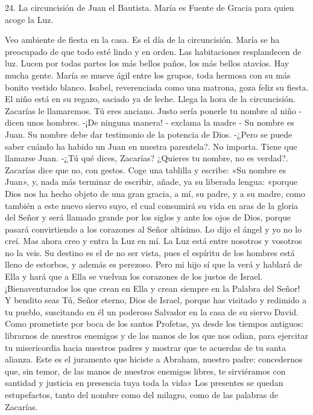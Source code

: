 \documentclass[12pt]{book} %
\begin{document}
 
 
24. 
La circuncisión de Juan el Bautista. 
María es Fuente de Gracia para quien acoge la Luz. 
 
Veo ambiente de fiesta en la casa. Es el día de la circuncisión. 
María se ha preocupado de que todo esté lindo y en orden. Las habitaciones resplandecen de luz. Lucen por todas partes los más bellos paños, los más bellos atavíos. Hay mucha gente. María se mueve ágil entre los grupos, toda hermosa con su más bonito vestido blanco. 
Isabel, reverenciada como una matrona, goza feliz su fiesta. El niño está en su regazo, saciado ya de leche. 
Llega la hora de la circuncisión. 
Zacarías le llamaremos. Tú eres anciano. Justo sería ponerle tu nombre al niño - dicen unos hombres. 
-¡De ninguna manera! - exclama la madre - Su nombre es Juan. Su nombre debe dar testimonio de la potencia de Dios. 
-¿Pero se puede saber cuándo ha habido un Juan en nuestra parentela?. 
No importa. Tiene que llamarse Juan. 
-¿Tú qué dices, Zacarías? ¿Quieres tu nombre, no es verdad?. 
Zacarías dice que no, con gestos. Coge una tablilla y escribe: «Su nombre es Juan», y, nada más terminar de escribir, 
añade, ya su liberada lengua: «porque Dios nos ha hecho objeto de una gran gracia, a mí, su padre, y a su madre, como también a este nuevo siervo suyo, el cual consumirá su vida en aras de la gloria del Señor y será llamado grande por los siglos y ante los ojos de Dios, porque pasará convirtiendo a los corazones al Señor altísimo. Lo dijo el ángel y yo no lo creí. Mas ahora creo y entra la Luz en mí. La Luz está entre nosotros y vosotros no la veis. Su destino es el de no ser vista, pues el espíritu de los hombres está lleno de estorbos, y además es perezoso. Pero mi hijo sí que la verá y hablará de Ella y hará que a Ella se vuelvan los corazones de los justos de Israel. ¡Bienaventurados los que crean en Ella y crean siempre en la Palabra del Señor! Y bendito seas Tú, Señor eterno, Dios de Israel, porque has visitado y redimido a tu pueblo, suscitando en él un poderoso Salvador en la casa de su siervo David. Como prometiste por boca de los santos Profetas, ya desde los tiempos antiguos: librarnos de nuestros enemigos y de las manos de los que nos odian, para ejercitar tu misericordia hacia nuestros padres y mostrar que te acuerdas de tu santa alianza. Este es el juramento que hiciste a Abraham, nuestro padre: concedernos que, sin temor, de las manos de nuestros enemigos libres, te sirviéramos con santidad y justicia en presencia tuya toda la vida»  
 	Los presentes se quedan estupefactos, tanto del nombre como del milagro, como de las palabras de Zacarías. 
\end{document}
